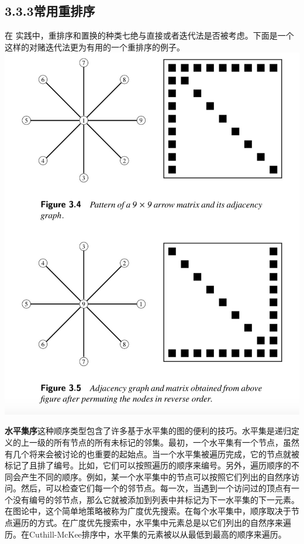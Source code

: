 \documentclass{article}
\begin{document}
\subsection*{3.3.3常用重排序}
在
实践中，重排序和置换的种类七绝与直接或者迭代法是否被考虑。下面是一个这样的对赌迭代法更为有用的一个重排序的例子。
\newline\newline\newline\newline\newline\newline\newline\newline
\newline\newline\newline\newline\newline\newline
\includegraphics[scale=0.25]{3_4_5.png}

\textbf{水平集序}这种顺序类型包含了许多基于水平集的图的便利的技巧。水平集是递归定义的上一级的所有节点的所有未标记的邻集。最初，一个水平集有一个节点，虽然有几个将来会被讨论的也重要的起始点。当一个水平集被遍历完成，它的节点就被标记了且排了编号。比如，它们可以按照遍历的顺序来编号。另外，遍历顺序的不同会产生不同的顺序。例如，某一个水平集中的节点可以按照它们列出的自然序访问。然后，可以检查它们每一个的邻节点。每一次，当遇到一个访问过的顶点有一个没有编号的邻节点，那么它就被添加到列表中并标记为下一水平集的下一元素。在图论中，这个简单地策略被称为广度优先搜索。在每个水平集中，顺序取决于节点遍历的方式。在广度优先搜索中，水平集中元素总是以它们列出的自然序来遍历。在Cuthill-McKee排序中，水平集的元素被以从最低到最高的顺序来遍历。



\end{document}
